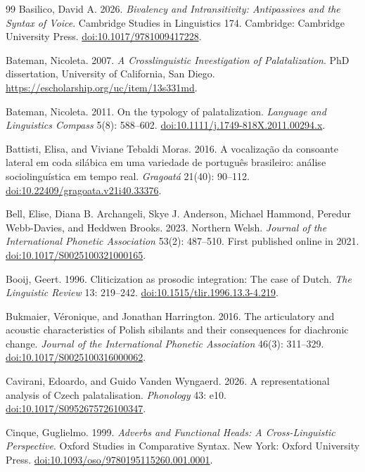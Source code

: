 \begin{thebibliography}{99}
Basilico, David A. 2026.
\textit{Bivalency and Intransitivity: Antipassives and the Syntax of Voice}.
Cambridge Studies in Linguistics 174. Cambridge: Cambridge University Press.
\href{https://doi.org/10.1017/9781009417228}{doi:10.1017/9781009417228}.

Bateman, Nicoleta. 2007.
\textit{A Crosslinguistic Investigation of Palatalization}.
PhD dissertation, University of California, San Diego.
\url{https://escholarship.org/uc/item/13s331md}.

Bateman, Nicoleta. 2011.
On the typology of palatalization.
\textit{Language and Linguistics Compass} 5(8): 588--602.
\href{https://doi.org/10.1111/j.1749-818X.2011.00294.x}{doi:10.1111/j.1749-818X.2011.00294.x}.

Battisti, Elisa, and Viviane Tebaldi Moras. 2016.
A vocalização da consoante lateral em coda silábica em uma variedade de
português brasileiro: análise sociolinguística em tempo real.
\textit{Gragoatá} 21(40): 90--112.
\href{https://doi.org/10.22409/gragoata.v21i40.33376}{doi:10.22409/gragoata.v21i40.33376}.

Bell, Elise, Diana B. Archangeli, Skye J. Anderson, Michael Hammond,
Peredur Webb-Davies, and Heddwen Brooks. 2023.
Northern Welsh.
\textit{Journal of the International Phonetic Association} 53(2): 487--510.
First published online in 2021.
\href{https://doi.org/10.1017/S0025100321000165}{doi:10.1017/S0025100321000165}.

Booij, Geert. 1996.
Cliticization as prosodic integration: The case of Dutch.
\textit{The Linguistic Review} 13: 219--242.
\href{https://doi.org/10.1515/tlir.1996.13.3-4.219}{doi:10.1515/tlir.1996.13.3-4.219}.

Bukmaier, V\'{e}ronique, and Jonathan Harrington. 2016.
The articulatory and acoustic characteristics of Polish sibilants and their
consequences for diachronic change.
\textit{Journal of the International Phonetic Association} 46(3): 311--329.
\href{https://doi.org/10.1017/S0025100316000062}{doi:10.1017/S0025100316000062}.

Cavirani, Edoardo, and Guido Vanden Wyngaerd. 2026.
A representational analysis of Czech palatalisation.
\textit{Phonology} 43: e10.
\href{https://doi.org/10.1017/S0952675726100347}{doi:10.1017/S0952675726100347}.

Cinque, Guglielmo. 1999.
\textit{Adverbs and Functional Heads: A Cross-Linguistic Perspective}.
Oxford Studies in Comparative Syntax. New York: Oxford University Press.
\href{https://doi.org/10.1093/oso/9780195115260.001.0001}{doi:10.1093/oso/9780195115260.001.0001}.


\end{thebibliography}
